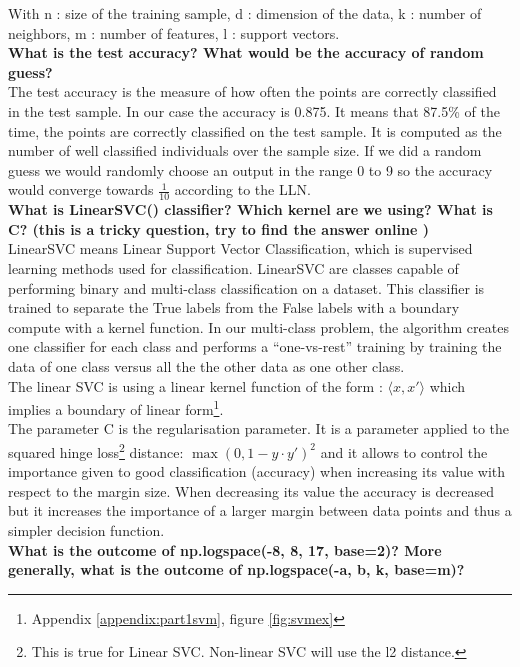 With n : size of the training sample, d : dimension of the data, k : number of neighbors, m : number of features, l : support vectors. \\

\textbf{What is the test accuracy? What would be the accuracy of random guess?} \\

The test accuracy is the measure of how often the points are correctly classified in the test sample. In our case the accuracy is 0.875.  It means that 87.5\% of the time, the points are correctly classified on the test sample. It is computed as the number of well classified individuals over the sample size. If we did a random guess we would randomly choose an output in the range 0 to 9 so the accuracy would converge towards $\frac{1}{10}$ according to the LLN.  \\


\textbf{What is LinearSVC() classifier? Which kernel are we using? What is C? (this is a tricky question, try to find the answer online )}\\

LinearSVC means Linear Support Vector Classification, which is supervised learning methods used for classification. LinearSVC are classes capable of performing binary and multi-class classification on a dataset. This classifier is trained to separate the True labels from the False labels with a boundary compute with a kernel function. In our multi-class problem, the algorithm creates one classifier for each class and performs a “one-vs-rest” training by training the data of one class versus all the the other data as one other class. 
\\
The linear SVC is using a linear kernel function of the form : $\langle x, x'\rangle$ which implies a boundary of linear form\footnote{Appendix \ref{appendix:part1svm}, figure \ref{fig:svmex}}.\\ The parameter C is the regularisation parameter. It is a parameter applied to the squared hinge loss\footnote{This is true for Linear SVC. Non-linear SVC will use the l2 distance.} distance: $\max(0, 1-y\cdot y')^2$ and it allows to control the importance given to good classification (accuracy) when increasing its value with respect to the margin size. When decreasing its value the accuracy is decreased but it increases the importance of a larger margin between data points and thus a simpler decision function. \\

\textbf{What is the outcome of np.logspace(-8, 8, 17, base=2)? More generally, what is the outcome of np.logspace(-a, b, k, base=m)?}\\

